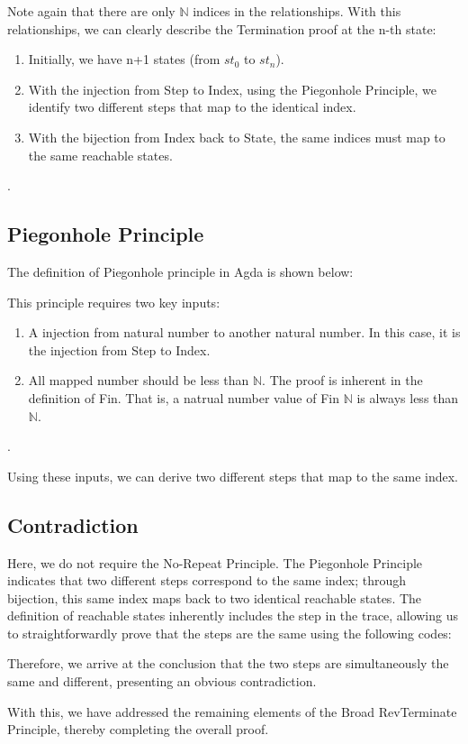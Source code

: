 

Note again that there are only $\mathbb{N}$ indices in the relationships.
With this relationships, we can clearly describe the Termination proof at the n-th state:
\begin{enumerate}[1.]
    \item Initially, we have n+1 states (from $st_{0}$ to $st_{n}$).
    \item With the injection from Step to Index, using the Piegonhole Principle, we identify two different steps that map to the identical index.
    \item With the bijection from Index back to State, the same indices must map to the same reachable states.
\end{enumerate}.

\subsection{ Piegonhole Principle }
The definition of Piegonhole principle in Agda is shown below:



This principle requires two key inputs:
\begin{enumerate}[1.]
    \item A injection from natural number to another natural number. In this case, it is the injection from Step to Index. 
    \item All mapped number should be less than $\mathbb{N}$.  The proof is inherent in the definition of Fin.  That is, a natrual number value of Fin $\mathbb{N}$ is always less than $\mathbb{N}$.
\end{enumerate}.

Using these inputs, we can derive two different steps that map to the same index.

\subsection{ Contradiction }
Here, we do not require the No-Repeat Principle.  
The Piegonhole Principle indicates that two different steps correspond to the same index; through bijection, this same index maps back to two identical reachable states.
The definition of reachable states inherently includes the step in the trace, allowing us to straightforwardly prove that the steps are the same using the following codes:



Therefore, we arrive at the conclusion that the two steps are simultaneously the same and different, presenting an obvious contradiction.

With this, we have addressed the remaining elements of the Broad RevTerminate Principle, thereby completing the overall proof.

